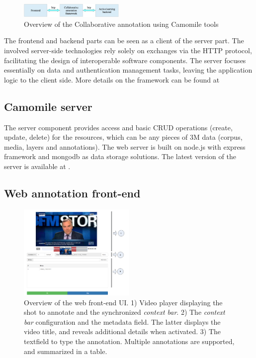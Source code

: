 \documentclass[a4paper]{article}
\begin{document}
\begin{figure}[h]
 	\includegraphics[width=0.45\textwidth]{overview.png}
	\caption{Overview of the Collaborative annotation using Camomile tools}
	\label{fig:overview}
\end{figure}

The frontend and backend parts can be seen as a client of the server part. The involved server-side technologies rely solely on exchanges via the HTTP protocol, facilitating the design of interoperable software components. The server focuses essentially on data and authentication management tasks, leaving the application logic to the client side. More details on the framework can be found at \cite{urlframework}


      \subsection{Camomile server}

The server component provides access and basic CRUD operations (create, update, delete) for the resources, which can be any pieces of 3M data (corpus, media, layers and annotations). The web server is built on node.js with express framework and mongodb as data storage solutions. The latest version of the server is available at \cite{urlserver}. 


      \subsection{Web annotation front-end}

\begin{figure}[h]
 	\includegraphics[width=0.5\textwidth]{camomile_ui.png}
	\caption{Overview of the web front-end UI. 1) Video player displaying the shot to annotate and the synchronized \emph{context bar}. 2) The \emph{context bar} configuration and the metadata field. The latter displays the video title, and reveals additional details when activated. 3) The textfield to type the annotation. Multiple annotations are supported, and summarized in a table.}
	\label{fig:frontend}

\end{figure}
\end{document}
